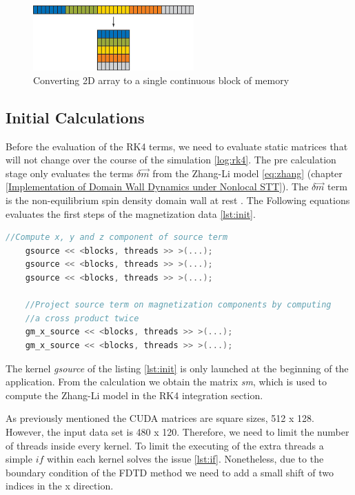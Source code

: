 \begin{figure}[htbp]
	\centering
		\includegraphics[width=0.55\textwidth]{Figures/flaten.png}
		\smallskip
	\caption[2D Flatten array]{Converting 2D array to a single continuous block of memory}
	\label{fig:flaten}
\end{figure}


\subsection{Initial Calculations}

Before the evaluation of the RK4 terms, we need to evaluate static matrices that will not change over the course of the simulation \ref{log:rk4}. The pre calculation stage only evaluates the terms $ \delta \vec{m}$ from the Zhang-Li model \ref{eq:zhang} (chapter \ref{Implementation of Domain Wall Dynamics under Nonlocal STT}). The  $ \delta \vec{m}$  term is the non-equilibrium spin density domain wall at rest \cite{claudio}. The Following equations evaluates the first steps of the magnetization data \ref{lst:init}.

\begin{lstlisting}[language=C++, label={lst:init}, caption={Initial calculations}]
	//Compute x, y and z component of source term
    gsource << <blocks, threads >> >(...);
    gsource << <blocks, threads >> >(...);
    gsource << <blocks, threads >> >(...);

    //Project source term on magnetization components by computing
    //a cross product twice
    gm_x_source << <blocks, threads >> >(...);
    gm_x_source << <blocks, threads >> >(...);
\end{lstlisting}

The kernel \textit{gsource} of the listing \ref{lst:init} is only launched at the beginning of the application. From the calculation we obtain the matrix \textit{sm}, which is used to compute the Zhang-Li model in the RK4 integration section.

As previously mentioned the CUDA matrices are square sizes, 512 x 128. However, the input data set is 480 x 120. Therefore, we need to limit the number of threads inside every kernel. To limit the executing of the extra threads a simple $if$ within each kernel solves the issue \ref{lst:if}. Nonetheless, due to the boundary condition of the FDTD method we need to add a small shift of two indices in the x direction.

